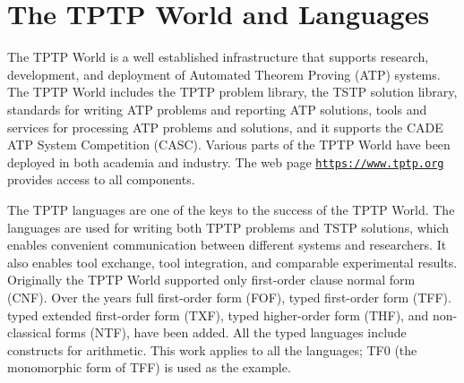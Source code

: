 \documentclass[letterpaper]{article}
\newcommand{\smalltt}[1]{\small \texttt{#1}}
\begin{document}
\section{The TPTP World and Languages}
\label{TPTP}

The TPTP World \cite{Sut17} is a well established infrastructure that supports research, 
development, and deployment of Automated Theorem Proving (ATP) systems.
The TPTP World includes the TPTP problem library,
the TSTP solution library,
standards for writing ATP problems and reporting ATP solutions,
tools and services for processing ATP problems and solutions,
and it supports the CADE ATP System Competition (CASC).
Various parts of the TPTP World have been deployed 
in both academia and industry.
The web page \smalltt{\url{https://www.tptp.org}} provides access to all components.

The TPTP languages \cite{Sut22-IGPL} are one of the keys to the success of the TPTP World.
The languages are used for writing both TPTP problems and TSTP solutions, which enables convenient 
communication between different systems and researchers. 
It also enables tool exchange, tool integration, and comparable experimental results.
Originally the TPTP World supported only first-order clause normal form (CNF).
Over the years full first-order form (FOF),
typed first-order form (TFF).
typed extended first-order form (TXF),
typed higher-order form (THF),
and non-classical forms (NTF),
have been added.
All the typed languages include constructs for arithmetic.
This work applies to all the languages; TF0 (the monomorphic form of TFF) \cite{SS+12} 
is used as the example.
\end{document}

